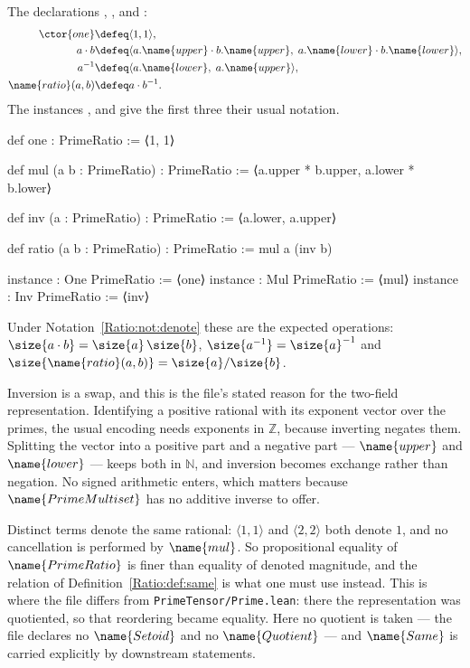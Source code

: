 \begin{definition}[Operations]\label{Ratio:def:ops}
The declarations , ,  and
:
\begin{align*}
  \ctor{one} &\defeq \langle 1, 1 \rangle, \\
  a \cdot b &\defeq
    \langle a.\name{upper} \cdot b.\name{upper},\;
            a.\name{lower} \cdot b.\name{lower} \rangle, \\
  a^{-1} &\defeq \langle a.\name{lower},\; a.\name{upper} \rangle, \\
  \name{ratio}(a, b) &\defeq a \cdot b^{-1}.
\end{align*}
The instances ,  and  give the first three
their usual notation.
\end{definition}

\begin{leancode}
def one : PrimeRatio := ⟨1, 1⟩

def mul (a b : PrimeRatio) : PrimeRatio :=
  ⟨a.upper * b.upper, a.lower * b.lower⟩

def inv (a : PrimeRatio) : PrimeRatio := ⟨a.lower, a.upper⟩

def ratio (a b : PrimeRatio) : PrimeRatio := mul a (inv b)

instance : One PrimeRatio := ⟨one⟩
instance : Mul PrimeRatio := ⟨mul⟩
instance : Inv PrimeRatio := ⟨inv⟩
\end{leancode}

Under Notation~\ref{Ratio:not:denote} these are the expected operations:
$\size{a \cdot b} = \size{a}\,\size{b}$, $\size{a^{-1}} = \size{a}^{-1}$ and
$\size{\name{ratio}(a,b)} = \size{a} / \size{b}$.

\begin{designnote}\label{Ratio:note:no-signs}
Inversion is a swap, and this is the file's stated reason for the two-field
representation.  Identifying a positive rational with its exponent vector
over the primes, the usual encoding needs exponents in $\mathbb{Z}$, because
inverting negates them.  Splitting the vector into a positive part and a
negative part --- $\name{upper}$ and $\name{lower}$ --- keeps both in
$\mathbb{N}$, and inversion becomes exchange rather than negation.  No signed
arithmetic enters, which matters because $\name{PrimeMultiset}$ has no
additive inverse to offer.
\end{designnote}

\begin{remark}\label{Ratio:rem:unreduced}
Distinct terms denote the same rational: $\langle 1, 1 \rangle$ and
$\langle 2, 2 \rangle$ both denote $1$, and no cancellation is performed by
$\name{mul}$.  So propositional equality of $\name{PrimeRatio}$ is finer than
equality of denoted magnitude, and the relation of
Definition~\ref{Ratio:def:same} is what one must use instead.  This is where
the file differs from \texttt{PrimeTensor/Prime.lean}: there the
representation was quotiented, so that reordering became equality.  Here no
quotient is taken --- the file declares no $\name{Setoid}$ and no
$\name{Quotient}$ --- and $\name{Same}$ is carried explicitly by downstream
statements.
\end{remark}

